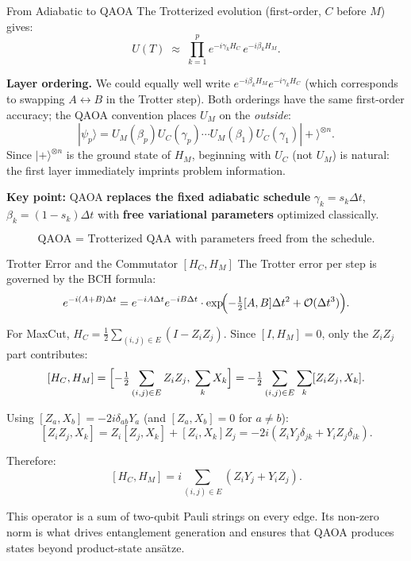 \documentclass{beamer}
\begin{document}
\begin{frame}
\begin{frame}{From Adiabatic to QAOA}
The Trotterized evolution (first-order, $C$ before $M$) gives:
\[
U(T) \;\approx\; \prod_{k=1}^p e^{-i\gamma_k H_C}\,e^{-i\beta_k H_M}.
\]

\textbf{Layer ordering.}  We could equally well write
$e^{-i\beta_k H_M}e^{-i\gamma_k H_C}$ (which corresponds to
swapping $A\leftrightarrow B$ in the Trotter step).
Both orderings have the same first-order accuracy; the QAOA
convention places $U_M$ on the \emph{outside}:
\[
|\psi_p\rangle = U_M(\beta_p)U_C(\gamma_p)\cdots U_M(\beta_1)U_C(\gamma_1)|+\rangle^{\otimes n}.
\]
Since $|+\rangle^{\otimes n}$ is the ground state of $H_M$, beginning
with $U_C$ (not $U_M$) is natural: the first layer immediately
imprints problem information.

\medskip
\textbf{Key point:} QAOA \textbf{replaces the fixed adiabatic schedule}
$\gamma_k = s_k\Delta t$, $\beta_k = (1-s_k)\Delta t$ with
\textbf{free variational parameters} optimized classically.

\[
\boxed{
\text{QAOA = Trotterized QAA with parameters freed from the schedule.}
}
\]
\end{frame}


\begin{frame}{Trotter Error and the Commutator $[H_C, H_M]$}
The Trotter error per step is governed by the BCH formula:
\[
e^{-i(A+B)\Delta t}
= e^{-iA\Delta t}e^{-iB\Delta t}
\cdot\exp\!\Bigl(-\tfrac{1}{2}[A,B]\Delta t^2 + \mathcal{O}(\Delta t^3)\Bigr).
\]

For MaxCut, $H_C = \tfrac{1}{2}\sum_{(i,j)\in E}(I-Z_iZ_j)$.  Since
$[I, H_M]=0$, only the $Z_iZ_j$ part contributes:
\[
[H_C,H_M]
= \Bigl[-\tfrac{1}{2}\sum_{(i,j)\in E}Z_iZ_j,\;\sum_k X_k\Bigr]
= -\tfrac{1}{2}\sum_{(i,j)\in E}\sum_k [Z_iZ_j, X_k].
\]

Using $[Z_a,X_b] = -2i\delta_{ab}Y_a$ (and $[Z_a,X_b]=0$ for $a\neq b$):
\[
[Z_iZ_j,X_k] = Z_i[Z_j,X_k]+[Z_i,X_k]Z_j
= -2i(Z_iY_j\delta_{jk}+Y_iZ_j\delta_{ik}).
\]

Therefore:
\[
[H_C,H_M] = i\sum_{(i,j)\in E}(Z_iY_j + Y_iZ_j).
\]

This operator is a sum of two-qubit Pauli strings on every edge.
Its non-zero norm is what drives entanglement generation and
ensures that QAOA produces states beyond product-state ansätze.
\end{frame}



\end{frame}
\end{document}
